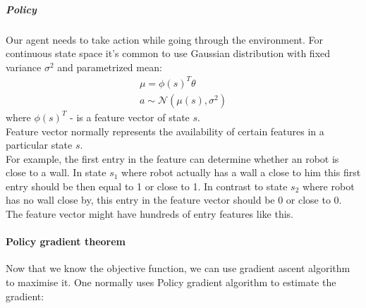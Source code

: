 \subparagraph{Policy} Our agent needs to take action while going through
the environment.
For continuous state space it's common to
use Gaussian distribution with fixed variance $\sigma^2$ and parametrized mean:
\begin{align} \label{eq:param_mean}
	\mu = \phi(s)^{T} \theta \\
	a \sim \mathcal{N}(\mu(s), \sigma^2)
\end{align}
where $\phi(s)^{T}$ - is a feature vector of state $s$. \\
Feature vector normally represents the availability of certain features in
a particular state $s$. \\
For example, the first entry in the feature can determine
whether an robot is close to a wall. In state $s_1$
where robot actually has a wall a close to him
this first entry should be then equal to 1 or close to 1.
In contrast to state $s_2$ where
robot has no wall close by, this entry in the feature vector
should be 0 or close to 0.
The feature vector might have hundreds of entry features like this.



%







\paragraph{Policy gradient theorem}
Now that we know the objective function, we can use gradient ascent
algorithm to maximise it. One normally uses Policy gradient
algorithm to estimate the gradient:

